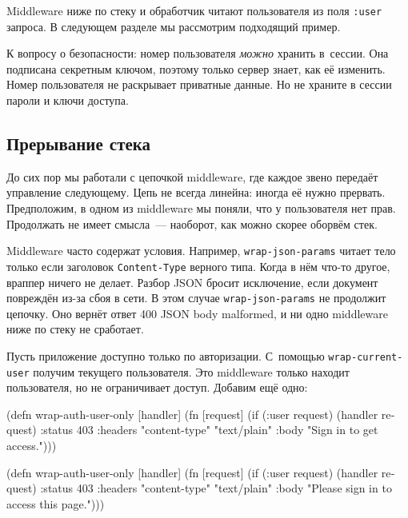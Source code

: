 Middleware ниже по стеку и обработчик читают пользователя из поля \verb|:user|
запроса. В следующем разделе мы рассмотрим подходящий пример.

К вопросу о безопасности: номер пользователя \emph{можно} хранить в~сессии. Она
подписана секретным ключом, поэтому только сервер знает, как её изменить. Номер
пользователя не раскрывает приватные данные. Но не храните в сессии пароли и
ключи доступа.

\subsection{Прерывание стека}


До сих пор мы работали с цепочкой middleware, где каждое звено передаёт
управление следующему. Цепь не всегда линейна: иногда её нужно
прервать. Предположим, в одном из middleware мы поняли, что у пользователя нет
прав. Продолжать не имеет смысла~--- наоборот, как можно скорее оборвём стек.


Middleware часто содержат условия. Например, \texttt{wrap\--json\--params} читает
тело только если заголовок \verb|Content-Type| верного типа. Когда в нём что-то
другое, враппер ничего не делает. Разбор JSON бросит исключение, если документ
повреждён из-за сбоя в сети. В этом случае \verb|wrap-json-params| не продолжит
цепочку. Оно вернёт ответ 400 JSON body malformed, и ни одно middleware ниже по
стеку не сработает.

Пусть приложение доступно только по авторизации. С~помощью
\verb|wrap-current-user| получим текущего пользователя. Это middleware только
находит пользователя, но не ограничивает доступ. Добавим ещё одно:


\ifnarrow

\begin{english}
  \begin{clojure}
(defn wrap-auth-user-only [handler]
  (fn [request]
    (if (:user request)
      (handler request)
      {:status 403
       :headers
       {"content-type" "text/plain"}
       :body "Sign in to get access."})))
  \end{clojure}
\end{english}

\else

\begin{english}
  \begin{clojure}
(defn wrap-auth-user-only [handler]
  (fn [request]
    (if (:user request)
      (handler request)
      {:status 403
       :headers {"content-type" "text/plain"}
       :body "Please sign in to access this page."})))
  \end{clojure}
\end{english}

